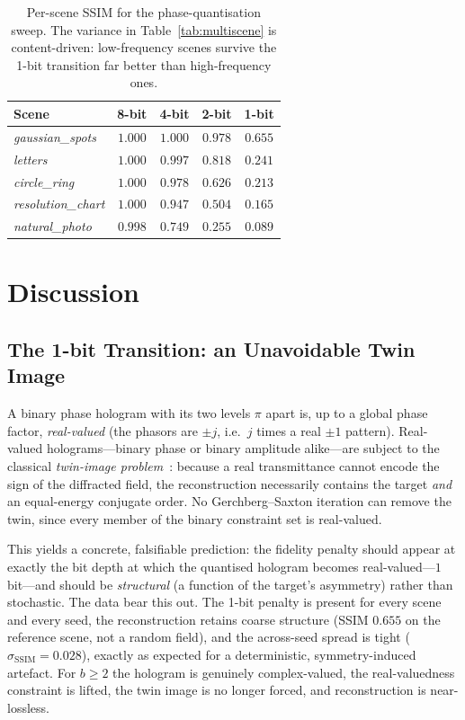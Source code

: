 \documentclass[conference]{IEEEtran}
\begin{document}
\begin{table}[t]
  \centering
  \caption{Per-scene SSIM for the phase-quantisation sweep. The variance in
  Table~\ref{tab:multiscene} is content-driven: low-frequency scenes survive the
  1-bit transition far better than high-frequency ones.}
  \label{tab:perscene}
  \begin{tabular}{lcccc}
    \toprule
    Scene & 8-bit & 4-bit & 2-bit & 1-bit \\
    \midrule
    \textit{gaussian\_spots}   & $1.000$ & $1.000$ & $0.978$ & $0.655$ \\
    \textit{letters}           & $1.000$ & $0.997$ & $0.818$ & $0.241$ \\
    \textit{circle\_ring}      & $1.000$ & $0.978$ & $0.626$ & $0.213$ \\
    \textit{resolution\_chart} & $1.000$ & $0.947$ & $0.504$ & $0.165$ \\
    \textit{natural\_photo}    & $0.998$ & $0.749$ & $0.255$ & $0.089$ \\
    \bottomrule
  \end{tabular}
\end{table}

\section{Discussion}
\label{sec:discussion}

\subsection{The 1-bit Transition: an Unavoidable Twin Image}
A binary phase hologram with its two levels $\pi$ apart is, up to a global phase
factor, \emph{real-valued} (the phasors are $\pm j$, i.e.\ $j$ times a real
$\pm1$ pattern). Real-valued holograms---binary phase or binary amplitude
alike---are subject to the classical \emph{twin-image
problem}~\cite{gabor1948new}: because a real transmittance cannot encode the sign
of the diffracted field, the reconstruction necessarily contains the target
\emph{and} an equal-energy conjugate order. No Gerchberg--Saxton iteration can
remove the twin, since every member of the binary constraint set is real-valued.

This yields a concrete, falsifiable prediction: the fidelity penalty should
appear at exactly the bit depth at which the quantised hologram becomes
real-valued---$1$ bit---and should be \emph{structural} (a function of the
target's asymmetry) rather than stochastic. The data bear this out. The 1-bit
penalty is present for every scene and every seed, the reconstruction retains
coarse structure (SSIM $0.655$ on the reference scene, not a random field), and
the across-seed spread is tight ($\sigma_{\text{SSIM}} = 0.028$), exactly as
expected for a deterministic, symmetry-induced artefact. For $b \ge 2$ the
hologram is genuinely complex-valued, the real-valuedness constraint is lifted,
the twin image is no longer forced, and reconstruction is near-lossless.
\end{document}
